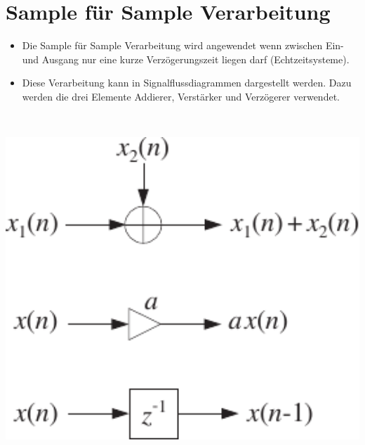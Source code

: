 \section{Sample für Sample Verarbeitung}
	\vspace*{-0.8cm}\begin{minipage}{0.65\textwidth}
		\begin{itemize}
		\item Die Sample für Sample Verarbeitung wird angewendet wenn zwischen Ein- und Ausgang nur eine kurze Verzögerungszeit liegen darf (Echtzeitsysteme).\\[-0.4cm]
		\item Diese Verarbeitung kann in Signalflussdiagrammen dargestellt werden. Dazu werden die drei Elemente Addierer, Verstärker und Verzögerer verwendet.
		\end{itemize}
	\end{minipage}
	\begin{minipage}{0.05\textwidth}$ $\end{minipage}
	\begin{minipage}{0.3\textwidth}
		\includegraphics[width = 1\textwidth]{pic/sampleSample.pdf}
	\end{minipage}\\[-0.5cm]
		
